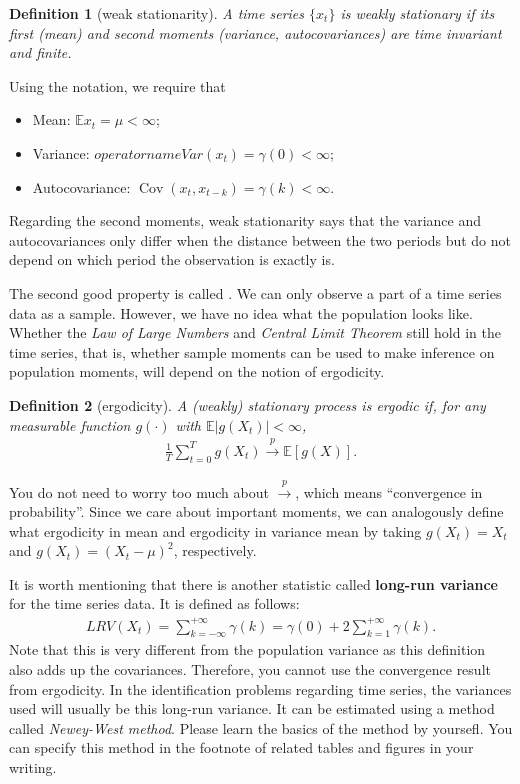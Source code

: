 \documentclass[12pt]{article}
\newtheorem{definition}{Definition}
\begin{document}
\begin{definition}[weak stationarity]
    A time series $\{x_t\}$ is \emph{weakly stationary} if its first (mean) and second moments (variance, autocovariances) are time invariant and finite.
\end{definition}
Using the notation, we require that
\begin{itemize}
    \item Mean: $\mathbb{E}x_t = \mu < \infty$;
    \item Variance: $operatorname{Var}(x_t) = \gamma(0) < \infty$;
    \item Autocovariance: $\operatorname{Cov}(x_t, x_{t-k}) = \gamma(k) < \infty $.
\end{itemize}
Regarding the second moments, weak stationarity says that the variance and autocovariances only differ when the distance between the two periods but do not depend on which period the observation is exactly is.

The second good property is called . We can only observe a part of a time series data as a sample. However, we have no idea what the population looks like. Whether the \textit{Law of Large Numbers} and \textit{Central Limit Theorem} still hold in the time series, that is, whether sample moments can be used to make inference on population moments, will depend on the notion of ergodicity.
\begin{definition}[ergodicity]
    A (weakly) stationary process is \emph{ergodic} if, for any measurable function $g(\cdot)$ with $\mathbb{E} |g(X_t)| < \infty$,
    \begin{align*}
        \frac{1}{T} \sum_{t=0}^T g(X_t) \xrightarrow{p} \mathbb{E}[g(X)].
    \end{align*}
\end{definition}
You do not need to worry too much about $\xrightarrow{p}$, which means ``convergence in probability''. Since we care about important moments, we can analogously define what ergodicity in mean and ergodicity in variance mean by taking $g(X_t) = X_t$ and $g(X_t) = (X_t - \mu)^2$, respectively.

It is worth mentioning that there is another statistic called \textbf{long-run variance} for the time series data. It is defined as follows:
\begin{align*}
    LRV(X_t) = \sum_{k=-\infty}^{+\infty} \gamma(k) = \gamma(0) + 2\sum_{k=1}^{+\infty} \gamma(k).
\end{align*}
Note that this is very different from the population variance as this definition also adds up the covariances. Therefore, you cannot use the convergence result from ergodicity. In the identification problems regarding time series, the variances used will usually be this long-run variance. It can be estimated using a method called \textit{Newey-West method}. Please learn the basics of the method by yoursefl. You can specify this method in the footnote of related tables and figures in your writing. 
\end{document}

